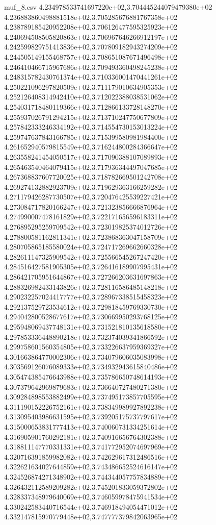 \begin{filecontents*}{muf_8.csv}
4.234978533741697220e+02,3.704445244079479380e+02
4.236883860498881518e+02,3.705285676881767358e+02
4.238789185420952208e+02,3.706126477595325923e+02
4.240694508505820863e+02,3.706967646266912197e+02
4.242599829751413836e+02,3.707809182943274209e+02
4.244505149155468757e+02,3.708651087671496498e+02
4.246410466715967686e+02,3.709493360498245238e+02
4.248315782430761374e+02,3.710336001470441261e+02
4.250221096297820509e+02,3.711179010634905353e+02
4.252126408314942410e+02,3.712022388038531062e+02
4.254031718480119366e+02,3.712866133728148270e+02
4.255937026791294215e+02,3.713710247750677809e+02
4.257842333246334192e+02,3.714554730153013224e+02
4.259747637843166785e+02,3.715399580981984400e+02
4.261652940579815549e+02,3.716244800284366647e+02
4.263558241454050517e+02,3.717090388107089893e+02
4.265463540464079415e+02,3.717936344497047685e+02
4.267368837607720025e+02,3.718782669501242708e+02
4.269274132882923709e+02,3.719629363166259282e+02
4.271179426287730507e+02,3.720476425539227421e+02
4.273084717820166247e+02,3.721323856666876964e+02
4.274990007478161829e+02,3.722171656596183311e+02
4.276895295259709542e+02,3.723019825374012726e+02
4.278800581162811341e+02,3.723868363047158709e+02
4.280705865185580024e+02,3.724717269662660328e+02
4.282611147325909542e+02,3.725566545267247420e+02
4.284516427581905305e+02,3.726416189907995431e+02
4.286421705951644867e+02,3.727266203631697863e+02
4.288326982433143826e+02,3.728116586485148218e+02
4.290232257024417777e+02,3.728967338515458323e+02
4.292137529723534612e+02,3.729818459769330730e+02
4.294042800528677617e+02,3.730669950293768125e+02
4.295948069437748131e+02,3.731521810135618580e+02
4.297853336448890218e+02,3.732374039341866592e+02
4.299758601560354805e+02,3.733226637959369327e+02
4.301663864770002306e+02,3.734079606035083998e+02
4.303569126076089333e+02,3.734932943615840486e+02
4.305474385476643988e+02,3.735786650748614193e+02
4.307379642969879683e+02,3.736640727480271380e+02
4.309284898553882499e+02,3.737495173857705595e+02
4.311190152226752161e+02,3.738349989927892238e+02
4.313095403986631595e+02,3.739205175737797617e+02
4.315000653831777413e+02,3.740060731334251614e+02
4.316905901760292181e+02,3.740916656764302388e+02
4.318811147770331331e+02,3.741772952074697969e+02
4.320716391859982082e+02,3.742629617312486516e+02
4.322621634027644859e+02,3.743486652524616147e+02
4.324526874271348902e+02,3.744344057757834889e+02
4.326432112589209282e+02,3.745201833059372802e+02
4.328337348979640069e+02,3.746059978475941534e+02
4.330242583440716544e+02,3.746918494054471012e+02
4.332147815970779448e+02,3.747777379842063965e+02

\end{filecontents*}
